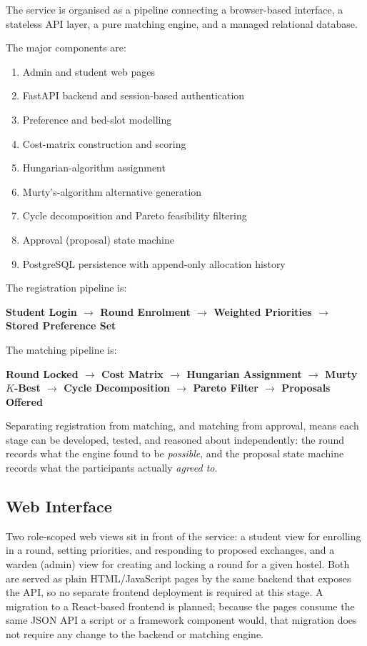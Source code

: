 \documentclass[11pt,a4paper]{report}
\begin{document}
The service is organised as a pipeline connecting a browser-based
interface, a stateless API layer, a pure matching engine, and a
managed relational database.

The major components are:

\begin{enumerate}
    \item Admin and student web pages
    \item FastAPI backend and session-based authentication
    \item Preference and bed-slot modelling
    \item Cost-matrix construction and scoring
    \item Hungarian-algorithm assignment
    \item Murty's-algorithm alternative generation
    \item Cycle decomposition and Pareto feasibility filtering
    \item Approval (proposal) state machine
    \item PostgreSQL persistence with append-only allocation history
\end{enumerate}

The registration pipeline is:

\begin{center}
\textbf{
Student Login
$\rightarrow$
Round Enrolment
$\rightarrow$
Weighted Priorities
$\rightarrow$
Stored Preference Set
}
\end{center}

The matching pipeline is:

\begin{center}
\textbf{
Round Locked
$\rightarrow$
Cost Matrix
$\rightarrow$
Hungarian Assignment
$\rightarrow$
Murty $K$-Best
$\rightarrow$
Cycle Decomposition
$\rightarrow$
Pareto Filter
$\rightarrow$
Proposals Offered
}
\end{center}

Separating registration from matching, and matching from approval,
means each stage can be developed, tested, and reasoned about
independently: the round records what the engine found to be
\emph{possible}, and the proposal state machine records what the
participants actually \emph{agreed to}.

\subsection{Web Interface}

Two role-scoped web views sit in front of the service: a student view
for enrolling in a round, setting priorities, and responding to
proposed exchanges, and a warden (admin) view for creating and locking
a round for a given hostel. Both are served as plain HTML/JavaScript
pages by the same backend that exposes the API, so no separate
frontend deployment is required at this stage. A migration to a
React-based frontend is planned; because the pages consume the same
JSON API a script or a framework component would, that migration does
not require any change to the backend or matching engine.
\end{document}
